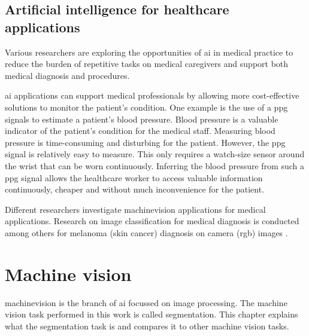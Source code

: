 \subsection{Artificial intelligence for healthcare applications}
\par{
    Various researchers are exploring the opportunities of \Gls{ai} in medical practice to reduce the burden of repetitive tasks on medical caregivers and support both medical diagnosis and procedures.
}
\par{
    \Gls{ai} applications can support medical professionals by allowing more cost-effective solutions to monitor the patient's condition.
    One example is the use of a \acrfull{ppg} signals to estimate a patient's blood pressure.
    Blood pressure is a valuable indicator of the patient's condition for the medical staff.
    Measuring blood pressure is time-consuming and disturbing for the patient. 
    However, the \acrshort{ppg} signal is relatively easy to measure. This only requires a watch-size sensor around the wrist that can be worn continuously.
    Inferring the blood pressure from such a \acrshort{ppg} signal\cite{Khalid2018} allows the healthcare worker to access valuable information continuously, cheaper and without much inconvenience for the patient.
}
\par{
    Different researchers investigate \Gls{machinevision} applications for medical applications. 
    Research on image classification for medical diagnosis is conducted among others for melanoma (skin cancer) diagnosis on camera (\acrshort{rgb}) images \cite{Vocaturo2019}.
}

\section{Machine vision}
\par{
    \Gls{machinevision} is the branch of \Gls{ai} focussed on image processing.
    The machine vision task performed in this work is called \Gls{segmentation}.
    This chapter explains what the segmentation task is and compares it to other machine vision tasks.
}


